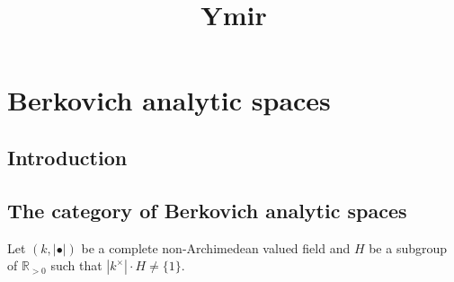 
\title{Ymir}

\maketitle
\tableofcontents

\chapter*{Berkovich analytic spaces}\label{chap-Berkovich}

\section{Introduction}\label{sec-introduction}




\section{The category of Berkovich analytic spaces}
Let $(k,|\bullet|)$ be a complete non-Archimedean valued field and $H$ be a subgroup of $\mathbb{R}_{>0}$ such that $|k^{\times}|\cdot H\neq \{1\}$.
 
